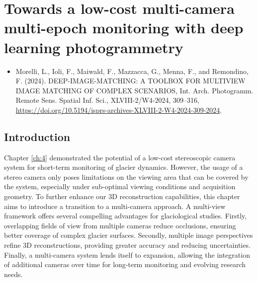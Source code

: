 \graphicspath{{figures/chapter5/}}
\onehalfspacing

\chapter{Towards a low-cost multi-camera multi-epoch monitoring with deep learning photogrammetry}\label{ch:5}

\vfill


\begin{itemize}
  \item Morelli, L., Ioli, F., Maiwald, F., Mazzacca, G., Menna, F., and Remondino, F. (2024). DEEP-IMAGE-MATCHING: A TOOLBOX FOR MULTIVIEW IMAGE MATCHING OF COMPLEX SCENARIOS, Int. Arch. Photogramm. Remote Sens. Spatial Inf. Sci., XLVIII-2/W4-2024, 309–316, \url{https://doi.org/10.5194/isprs-archives-XLVIII-2-W4-2024-309-2024}. 
\end{itemize}

\newpage

\section{Introduction}\label{sec:5:intro}


Chapter \ref{ch:4} demonstrated the potential of a low-cost stereoscopic camera system for short-term monitoring of glacier dynamics. 
However, the usage of a stereo camera only poses limitations on the viewing area that can be covered by the system, especially under sub-optimal viewing conditions and acquisition geometry.
To further enhance our 3D reconstruction capabilities, this chapter aims to introduce a transition to a multi-camera approach.  
A multi-view framework offers several compelling advantages for glaciological studies.  
Firstly, overlapping fields of view from multiple cameras reduce occlusions, ensuring better coverage of complex glacier surfaces. 
Secondly, multiple image perspectives refine 3D reconstructions, providing greater accuracy and reducing uncertainties. 
Finally, a multi-camera system lends itself to expansion, allowing the integration of additional cameras over time for long-term monitoring and evolving research needs.

